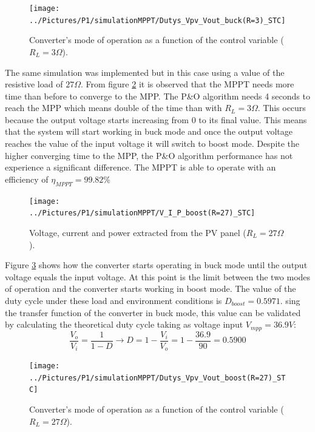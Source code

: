 \begin{figure}[H]
	\begin{center}
		\texttt{[image: ../Pictures/P1/simulationMPPT/Dutys\_Vpv\_Vout\_buck(R=3)\_STC]}
		\caption{Converter's mode of operation as a function of the control variable ($R_{L}=3\Omega$).}
		\label{buckSTC_duty} 
	\end{center}	
\end{figure}

The same simulation was implemented but in this case using a value of the resistive load of $27\Omega$. From figure \ref{boostSTC} it is observed that the MPPT needs more time than before to converge to the MPP. The P\&O algorithm needs 4 seconds to reach the MPP which means double of the time than with $R_{L}=3\Omega$. This occurs because the output voltage starts increasing from 0 to its final value. This means that the system will start working in buck mode and once the output voltage reaches the value of the input voltage it will switch to boost mode. Despite the higher converging time to the MPP, the P\&O algorithm performance has not experience a significant difference. The MPPT is able to operate with an efficiency of $\eta_{MPPT} = 99.82\% $


\begin{figure}[H]
	\begin{center}
		\texttt{[image: ../Pictures/P1/simulationMPPT/V\_I\_P\_boost(R=27)\_STC]}
		\caption{Voltage, current and power extracted from the PV panel ($R_{L}=27\Omega$).}
		\label{boostSTC} 
	\end{center}	
\end{figure}

Figure \ref{boostSTC_duty} shows how the converter starts operating in buck mode until the output voltage equals the input voltage. At this point is the limit between the two modes of operation and the converter starts working in boost mode. The value of the duty cycle under these load and environment conditions is $D_{boost}= 0.5971$. sing the transfer function of the converter in  buck mode, this value can be validated by calculating the theoretical duty cycle taking as voltage input $V_{mpp}=36.9 V$: 
\begin{equation}
\frac{V_o}{V_i}= \frac{1}{1-D} \rightarrow D = 1 - \frac{V_i}{V_o} = 1 - \frac{36.9}{90} = 0.5900
\end{equation}
 
\begin{figure}[H]
	\begin{center}
		\texttt{[image: ../Pictures/P1/simulationMPPT/Dutys\_Vpv\_Vout\_boost(R=27)\_STC]}
		\caption{Converter's mode of operation as a function of the control variable ($R_{L}=27\Omega$).}
		\label{boostSTC_duty} 
	\end{center}	
\end{figure}

